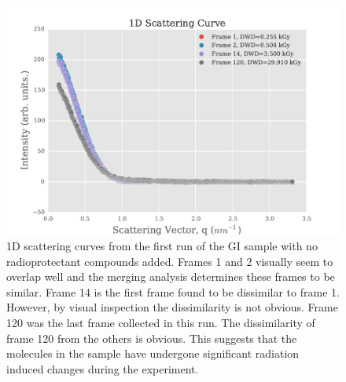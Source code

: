 \begin{figure}
    \centering
    \includegraphics[width=1.0\textwidth]{figures/saxs/scatter_curves.pdf}
    \caption[Increasing dissimilarity of 1D SAXS curves with increasing X-ray exposure.]{1D scattering curves from the first run of the GI sample with no radioprotectant compounds added.
    Frames 1 and 2 visually seem to overlap well and the merging analysis determines these frames to be similar.
    Frame 14 is the first frame found to be dissimilar to frame 1.
    However, by visual inspection the dissimilarity is not obvious.
    Frame 120 was the last frame collected in this run.
    The dissimilarity of frame 120 from the others is obvious.
    This suggests that the molecules in the sample have undergone significant radiation induced changes during the experiment.}
    \label{fig:1D Scatter Curves}
\end{figure}

